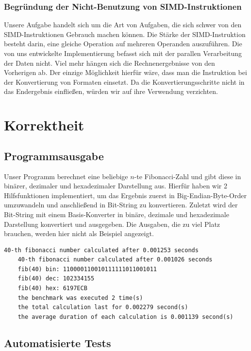 \documentclass[course=erap]{aspdoc}
\begin{document}
\subsubsection{Begründung der Nicht-Benutzung von SIMD-Instruktionen}
Unsere Aufgabe handelt sich um die Art von Aufgaben, die sich schwer von den SIMD-Instruktionen Gebrauch machen können. Die Stärke der SIMD-Instruktion besteht darin, eine gleiche Operation auf mehreren Operanden auszuführen. Die von uns entwickelte Implementierung befasst sich mit der parallen Verarbeitung der Daten nicht. Viel mehr hängen sich die Rechnenergebnisse von den Vorherigen ab. Der einzige Möglichkeit hierfür wäre, dass man die Instruktion bei der Konvertierung von Formaten einsetzt. Da die Konvertierungsschritte nicht in das Endergebnis einfließen, würden wir auf ihre Verwendung verzichten.  

\section{Korrektheit}
\subsection{Programmsausgabe}
Unser Programm berechnet eine beliebige $n$-te Fibonacci-Zahl und gibt diese in binärer, dezimaler und hexadezimaler Darstellung aus. Hierfür haben wir 2 Hilfsfunktionen implementiert, um das Ergebnis zuerst in Big-Endian-Byte-Order umzuwandeln und anschließend in Bit-String zu konvertieren. Zuletzt wird der Bit-String mit einem Basis-Konverter in binäre, dezimale und hexadezimale Darstellung konvertiert und ausgegeben. Die Ausgaben, die zu viel Platz brauchen, werden hier nicht als Beispiel angezeigt.
\begin{lstlisting}[caption={Ausgabe mit Command ./fib -n40 -V0 -B2. Implementierung v0 wird hierbei verwendet und benchmark ist aktiviert mit 1 Iteration.}, keywords={}]
	40-th fibonacci number calculated after 0.001253 seconds
	40-th fibonacci number calculated after 0.001026 seconds
	fib(40) bin: 110000110010111111011001011
	fib(40) dec: 102334155
	fib(40) hex: 6197ECB
	the benchmark was executed 2 time(s)
	the total calculation last for 0.002279 second(s)
	the average duration of each calculation is 0.001139 second(s)
\end{lstlisting}

\subsection{Automatisierte Tests}
\end{document}
